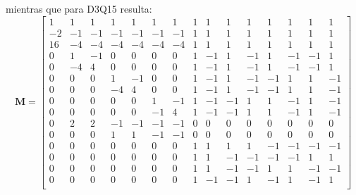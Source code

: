 mientras que para D3Q15 resulta:
\setcounter{MaxMatrixCols}{15}
\begin{equation}
	\bm{M}=
	\begin{bmatrix}
	 1  &  1 &  1 &  1 &  1 & 1 &  1 &  1 &  1 & 1 & 1 & 1 & 1 & 1 & 1 \\
	 -2 & -1 & -1 & -1 & -1 & -1 & -1 & 1 & 1 & 1 & 1 & 1 & 1 & 1 & 1 \\
 	 16 & -4 & -4 & -4 & -4 & -4 & -4 & 1 & 1 & 1 & 1 & 1 & 1 & 1 & 1 \\
 	 0 & 1 & -1 & 0 & 0 & 0 & 0 & 1 & -1 & 1 & -1 & 1 & -1 & -1 & 1 \\
 	 0 & -4 & 4 & 0 & 0 & 0 & 0 & 1 & -1 & 1 & -1 & 1 & -1 & -1 & 1 \\
 	 0 & 0 & 0 & 1 & -1 & 0 & 0 & 1 & -1 & 1 & -1 & -1 & 1 & 1 & -1 \\
 	 0 & 0 & 0 & -4 & 4 & 0 & 0 & 1 & -1 & 1 & -1 & -1 & 1 & 1 & -1 \\
 	 0 & 0 & 0 & 0 & 0 & 1 & -1 & 1 & -1 & -1 & 1 & 1 & -1 & 1 & -1 \\
 	 0 & 0 & 0 & 0 & 0 & -1 & 4 & 1 & -1 & -1 & 1 & 1 & -1 & 1 & -1 \\
 	 0 & 2 & 2 & -1 & -1 & -1 & -1 & 0 & 0 & 0 & 0 & 0 & 0 & 0 & 0 \\
 	 0 & 0 & 0 & 1 & 1 & -1 & -1 & 0 & 0 & 0 & 0 & 0 & 0 & 0 & 0 \\
 	 0 & 0 & 0 & 0 & 0 & 0 & 0 & 1 & 1 & 1 & 1 & -1 & -1 & -1 & -1 \\
 	 0 & 0 & 0 & 0 & 0 & 0 & 0 & 1 & 1 & -1 & -1 & -1 & -1 & 1 & 1 \\
 	 0 & 0 & 0 & 0 & 0 & 0 & 0 & 1 & 1 & -1 & -1 & 1 & 1 & -1 & -1 \\
 	 0 & 0 & 0 & 0 & 0 & 0 & 0 & 1 & -1 & -1 & 1 & -1 & 1 & -1 & 1 \\
	\end{bmatrix}
	\label{eq:MTR_M_D2Q9}
\end{equation} 

